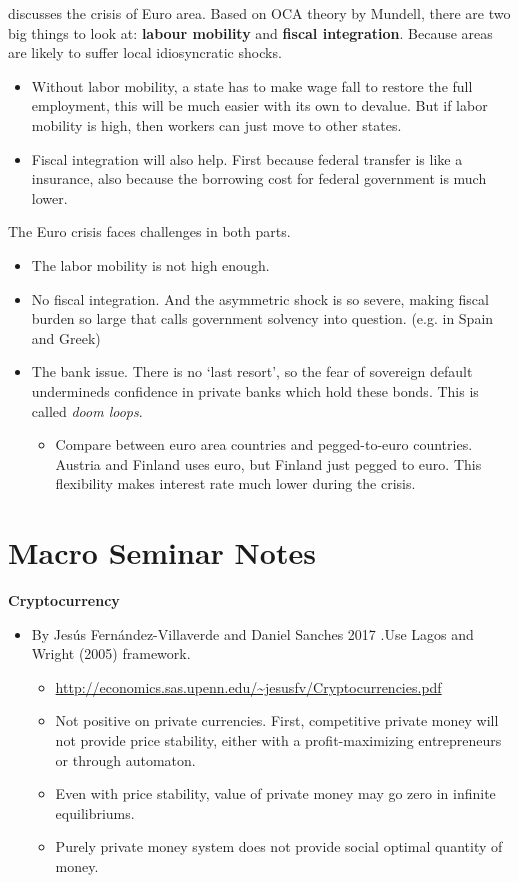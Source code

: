 \documentclass{book}
\theoremstyle{plain}
\theoremstyle{definition}
\begin{document}
\cite{Krugman:2012eu} discusses the crisis of Euro area. Based on OCA theory by Mundell, there are two big things to look at: \textbf{labour mobility} and \textbf{fiscal integration}. Because areas are likely to suffer local idiosyncratic shocks. 
\begin{itemize}
	\item Without labor mobility, a state has to make wage fall to restore the full employment, this will be much easier with its own to devalue. But if labor mobility is high, then workers can just move to other states.
	\item Fiscal integration will also help. First because federal transfer is like a insurance, also because the borrowing cost for federal government is much lower.
\end{itemize}
The Euro crisis faces challenges in both parts.
\begin{itemize}
	\item The labor mobility is not high enough.
	\item No fiscal integration. And the asymmetric shock is so severe, making fiscal burden so large that calls government solvency into question. (e.g. in Spain and Greek)
	\item The bank issue. There is no `last resort', so the fear of sovereign default undermineds confidence in private banks which hold these bonds. This is called \textit{doom loops}.
	\begin{itemize}
		\item Compare between euro area countries and pegged-to-euro countries. Austria and Finland uses euro, but Finland just pegged to euro. This flexibility makes interest rate much lower during the crisis.
	\end{itemize}
\end{itemize}

\vspace{2mm}
\textbf{}


\chapter{Macro Seminar Notes} %
\label{cha:macro_seminar_notes}

\noindent
\textbf{Cryptocurrency}

\begin{itemize}
	\item By Jesús Fernández-Villaverde and Daniel	Sanches 2017
		.Use Lagos and Wright (2005) framework.
	\begin{itemize}
		\item \url{http://economics.sas.upenn.edu/~jesusfv/Cryptocurrencies.pdf}
		\item Not positive on private currencies. First, competitive private money will not provide price stability, either with a profit-maximizing entrepreneurs or through automaton.
		\item Even with price stability, value of private money may go zero in infinite equilibriums.
		\item Purely private money system does not provide social optimal quantity of money.
	\end{itemize}
\end{itemize}
\end{document}
